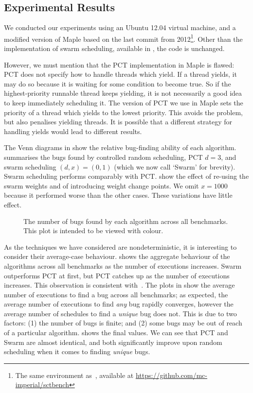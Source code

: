 \subsection{Experimental Results}
\label{sec:algorithms-eval-results}

We conducted our experiments using an Ubuntu 12.04 virtual machine,
and a modified version of Maple based on the last commit from
2012\footnote{The same environment as~\cite{thomson2016}, available at
  \url{https://github.com/mc-imperial/sctbench}}.  Other than the
implementation of swarm scheduling, available in , the
code is unchanged.

However, we must mention that the PCT implementation in Maple is
flawed: PCT does not specify how to handle threads which yield.  If a
thread yields, it may do so because it is waiting for some condition
to become true.  So if the highest-priority runnable thread keeps
yielding, it is not necessarily a good idea to keep immediately
scheduling it.  The version of PCT we use in Maple sets the priority
of a thread which yields to the lowest priority.  This avoids the
problem, but also penalises yielding threads.  It is possible that a
different strategy for handling yields would lead to different
results.

The Venn diagrams in  show the relative bug-finding ability of
each algorithm.   summarises the bugs found by controlled
random scheduling, PCT $d=3$, and swarm scheduling $(d,x)=(0,1)$ (which we now
call `Swarm' for brevity).  Swarm scheduling performs comparably
with PCT.   show the effect of re-using
the swarm weights and of introducing weight change points.  We omit $x=1000$
because it performed worse than the other cases.  These variations
have little effect.

\begin{figure}
  \centering
  
  \caption[Plot of bugs found by each scheduling algorithm.]{The number of bugs found by each algorithm across all benchmarks.  This plot is intended to be viewed with colour.}\label{fig:totalbugs}
\end{figure}

As the techniques we have considered are nondeterministic, it is interesting to
consider their average-case behaviour.   shows the aggregate
behaviour of the algorithms across all benchmarks as the number of executions
increases.  Swarm outperforms PCT at first, but PCT catches up
as the number of executions increases.  This observation is consistent
with~\cite{thomson2016}.  The plots in  show the average number
of executions to find a bug across all benchmarks; as expected,
the average number of executions to find \emph{any} bug rapidly converges,
however the average number of schedules to find a \emph{unique} bug does not.
This is due to two factors: (1) the number of bugs is finite; and (2) some bugs
may be out of reach of a particular algorithm.   shows the final
values.  We can see that PCT and Swarm are almost identical, and both
significantly improve upon random scheduling when it comes to
finding \emph{unique} bugs.

